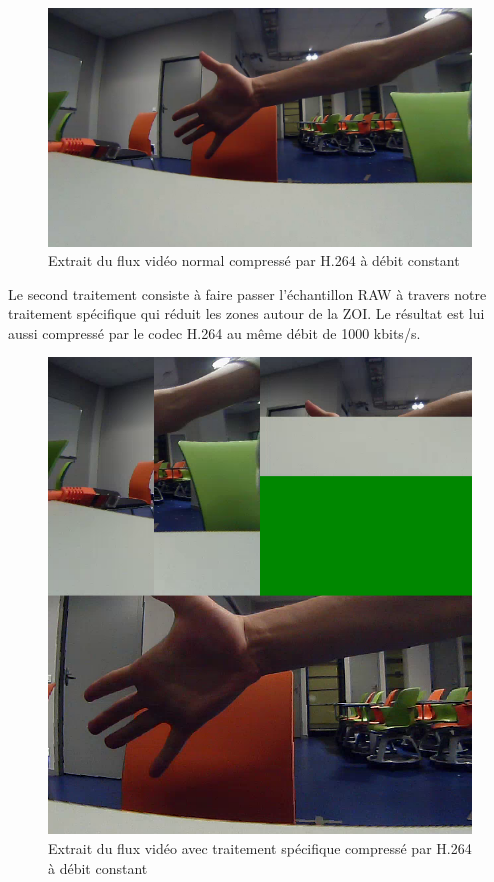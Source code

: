 \documentclass[11pt,a4paper]{article}
\begin{document}
\begin{figure}[H]
\begin{center}
\includegraphics[scale=0.25]{images/comparaison_flux1.png}
\end{center}
\caption{Extrait du flux vidéo normal compressé par H.264 à débit constant}
\label{}
\end{figure}

\bigbreak
Le second traitement consiste à faire passer l'échantillon RAW à travers notre traitement spécifique qui réduit les zones autour de la ZOI.
Le résultat est lui aussi compressé par le codec H.264 au même débit de 1000 kbits/s.

\begin{figure}[H]
\begin{center}
\includegraphics[scale=0.25]{images/comparaison_flux2.png}
\end{center}
\caption{Extrait du flux vidéo avec traitement spécifique compressé par H.264 à débit constant}
\label{}
\end{figure}
\end{document}
